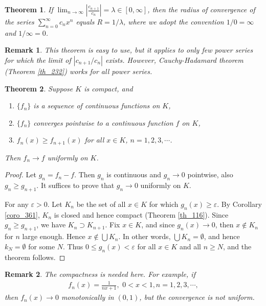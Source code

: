 \documentclass[10pt]{book}
\newtheorem{theorem}{Theorem}[chapter]
\newtheorem{remark}{Remark}[chapter]
\theoremstyle{definition}
\numberwithin{equation}{chapter}
\begin{document}
\begin{theorem}
If $\lim_{n\to\infty} \displaystyle \left|\frac{c_{n+1}}{c_n}\right| = \lambda \in [0,\infty]$, then the radius of convergence of the series $\sum^\infty_{n=0} c_n x^n$ equals $R = 1/\lambda$, where we adopt the convention $1/0 = \infty$ and $1/\infty = 0$.
\end{theorem}

\medskip

\begin{remark}
This theorem is easy to use, but it applies to only few power series for which the limit of $\left|c_{n+1}/c_n\right|$ exists. However, Cauchy-Hadamard theorem (Theorem \ref{th_232}) works for {\em all} power series.
\end{remark}

\medskip

\begin{theorem}
Suppose $K$ is compact, and
\begin{enumerate}[label=(\alph*)]
    \item $\{f_n\}$ is a sequence of continuous functions on $K$,
    
    \item $\{f_n\}$ converges pointwise to a continuous function $f$ on $K$,
    
    \item $f_n(x) \geq f_{n+1}(x)$ for all $x \in K$, $n = 1,2,3,\cdots$.
\end{enumerate}
Then $f_n \to f$ uniformly on $K$.
\end{theorem}
\begin{proof}
Let $g_n = f_n - f$. Then $g_n$ is continuous and $g_n \to 0$ pointwise, also $g_n \geq g_{n+1}$. It suffices to prove that $g_n \to 0$ uniformly on $K$.

For any $\varepsilon > 0$. Let $K_n$ be the set of all $x \in K$ for which $g_n(x) \geq \varepsilon$. By Corollary \ref{coro_361}, $K_n$ is closed and hence compact (Theorem \ref{th_116}). Since $g_n \geq g_{n+1}$, we have $K_n \supset K_{n+1}$. Fix $x \in K$, and since $g_n(x) \to 0$, then $x \notin K_n$ for $n$ large enough. Hence $x \notin \bigcup K_n$. In other words, $\bigcup K_n = \emptyset$, and hence $k_N = \emptyset$ for some $N$. Thus $0 \leq g_n(x) < \varepsilon$ for all $x \in K$ and all $n \geq N$, and the theorem follows. 
\end{proof}

\medskip

\begin{remark}
The compactness is needed here. For example, if
\begin{align*}
    f_n(x) = \frac{1}{nx + 1}, \,\, 0 < x < 1, n = 1,2,3,\cdots,
\end{align*}
then $f_n(x) \to 0$ monotonically in $(0,1)$, but the convergence is not uniform.
\end{remark}
\end{document}
